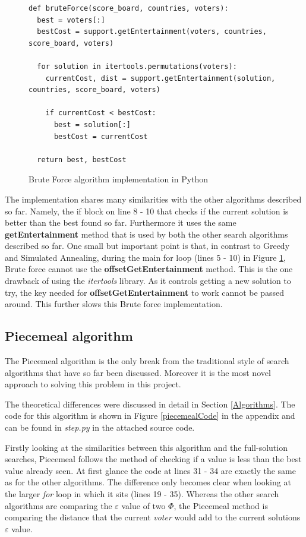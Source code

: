 \documentclass[12pt]{report}
\begin{document}
\begin{figure}[H]
\caption{Brute Force algorithm implementation in Python}
\label{bruteForce}
\begin{lstlisting}
def bruteForce(score_board, countries, voters):
  best = voters[:]
  bestCost = support.getEntertainment(voters, countries, score_board, voters)

  for solution in itertools.permutations(voters):
    currentCost, dist = support.getEntertainment(solution, countries, score_board, voters)

    if currentCost < bestCost:
      best = solution[:]
      bestCost = currentCost

  return best, bestCost
\end{lstlisting}
\end{figure}

The implementation shares many similarities with the other algorithms described so far. Namely, the if block on line 8 - 10 that checks if the current solution is better than the best found so far. Furthermore it uses the same \textbf{getEntertainment} method that is used by both the other search algorithms described so far. One small but important point is that, in contrast to Greedy and Simulated Annealing, during the main for loop (lines 5 - 10) in Figure \ref{bruteForce}, Brute force cannot use the \textbf{offsetGetEntertainment} method. This is the one drawback of using the \textit{itertools} library. As it controls getting a new solution to try, the key needed for \textbf{offsetGetEntertainment} to work cannot be passed around. This further slows this Brute force implementation.

\subsection{Piecemeal algorithm}\label{Imp-Piecemeal}
The Piecemeal algorithm is the only break from the traditional style of search algorithms that have so far been discussed. Moreover it is the most novel approach to solving this problem in this project.

The theoretical differences were discussed in detail in Section \ref{Algorithms}. The code for this algorithm is shown in Figure \ref{piecemealCode} in the appendix and can be found in \textit{step.py} in the attached source code.

Firstly looking at the similarities between this algorithm and the full-solution searches, Piecemeal follows the method of checking if a value is less than the best value already seen. At first glance the code at lines 31 - 34 are exactly the same as for the other algorithms. The difference only becomes clear when looking at the larger \textit{for} loop in which it sits (lines 19 - 35). Whereas the other search algorithms are comparing the $\varepsilon$ value of two $\Phi$, the Piecemeal method is comparing the distance that the current \textit{voter} would add to the current solutions $\varepsilon$ value.
\end{document}
